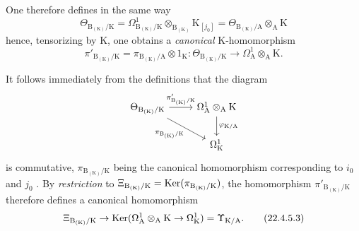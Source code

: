 \begin{env}[22.4.5]
One therefore defines in the same way
\[
  \Theta_{\mathrm{B}_{(\mathrm{K})}/\mathrm{K}}=\Omega^1_{\mathrm{B}_{(\mathrm{K})}/\mathrm{K}}\otimes_{\mathrm{B}_{(\mathrm{K})}}\mathrm{K}_{[j_0]}=\Theta_{\mathrm{B}_{(\mathrm{K})}/\mathrm{A}}\otimes_\mathrm{A}\mathrm{K}
\]
hence, tensorizing  by $\mathrm{K}$, one obtains a \emph{canonical} $\mathrm{K}$-homomorphism
\[
\label{0.22.4.5.2}
  \pi'_{\mathrm{B}_{(\mathrm{K})}/\mathrm{K}}=\pi_{\mathrm{B}_{(\mathrm{K})}/\mathrm{A}}\otimes 1_\mathrm{K}:\Theta_{\mathrm{B}_{(\mathrm{K})}/\mathrm{K}}\to\Omega^1_\mathrm{A}\otimes_\mathrm{A}\mathrm{K}.
  \tag{22.4.5.2}
\]

It follows immediately from the definitions that the diagram
\[
  \begin{tikzcd}
    \Theta_{\mathrm{B}_{(\mathrm{K})}/\mathrm{K}} \ar[r,"\pi'_{\mathrm{B}_{(\mathrm{K})}/\mathrm{K}}"] \ar[dr,"\pi_{\mathrm{B}_{(\mathrm{K})}/\mathrm{K}}",swap] & \Omega^1_\mathrm{A}\otimes_\mathrm{A}\mathrm{K} \ar[d,"\varphi_{\mathrm{K}/\mathrm{A}}"]\\
    & \Omega^1_\mathrm{K}
  \end{tikzcd}
\]
is commutative, $\pi_{\mathrm{B}_{(\mathrm{K})}/\mathrm{K}}$ being the canonical homomorphism corresponding to $i_0$ and $j_0$ .
By \emph{restriction} to $\Xi_{\mathrm{B}_{(\mathrm{K})}/\mathrm{K}}=\operatorname{Ker}(\pi_{\mathrm{B}_{(\mathrm{K})}/\mathrm{K}})$, the homomorphism $\pi'_{\mathrm{B}_{(\mathrm{K})}/\mathrm{K}}$ therefore defines a canonical homomorphism
\[
\label{0.22.4.5.3}
  \Xi_{\mathrm{B}_{(\mathrm{K})}/\mathrm{K}}\to\operatorname{Ker}(\Omega^1_\mathrm{A}\otimes_\mathrm{A}\mathrm{K}\to\Omega^1_\mathrm{K})=\Upsilon_{\mathrm{K}/\mathrm{A}}.
  \tag{22.4.5.3}
\]
\end{env}

